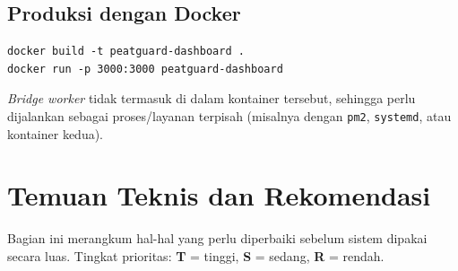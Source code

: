 \documentclass[11pt,a4paper]{article}
\newcommand{\kode}[1]{\texttt{#1}}
\begin{document}
\subsection{Produksi dengan Docker}
\begin{lstlisting}
docker build -t peatguard-dashboard .
docker run -p 3000:3000 peatguard-dashboard
\end{lstlisting}
\textit{Bridge worker} tidak termasuk di dalam kontainer tersebut, sehingga perlu dijalankan sebagai
proses/layanan terpisah (misalnya dengan \kode{pm2}, \kode{systemd}, atau kontainer kedua).

\section{Temuan Teknis dan Rekomendasi}
\label{sec:temuan}

Bagian ini merangkum hal-hal yang perlu diperbaiki sebelum sistem dipakai secara luas.
Tingkat prioritas: \textbf{T} = tinggi, \textbf{S} = sedang, \textbf{R} = rendah.
\end{document}
